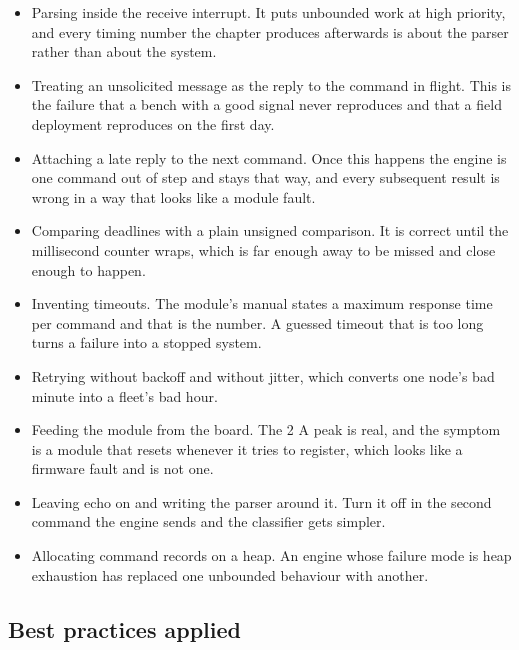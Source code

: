 \begin{itemize}
\item Parsing inside the receive interrupt. It puts unbounded work at high
priority, and every timing number the chapter produces afterwards is about the
parser rather than about the system.
\item Treating an unsolicited message as the reply to the command in flight.
This is the failure that a bench with a good signal never reproduces and that a
field deployment reproduces on the first day.
\item Attaching a late reply to the next command. Once this happens the engine is
one command out of step and stays that way, and every subsequent result is
wrong in a way that looks like a module fault.
\item Comparing deadlines with a plain unsigned comparison. It is correct until
the millisecond counter wraps, which is far enough away to be missed and close
enough to happen.
\item Inventing timeouts. The module's manual states a maximum response time per
command and that is the number. A guessed timeout that is too long turns a
failure into a stopped system.
\item Retrying without backoff and without jitter, which converts one node's bad
minute into a fleet's bad hour.
\item Feeding the module from the board. The 2 A peak is real, and the symptom is
a module that resets whenever it tries to register, which looks like a firmware
fault and is not one.
\item Leaving echo on and writing the parser around it. Turn it off in the
second command the engine sends and the classifier gets simpler.
\item Allocating command records on a heap. An engine whose failure mode is heap
exhaustion has replaced one unbounded behaviour with another.
\end{itemize}

\subsection*{Best practices applied}

